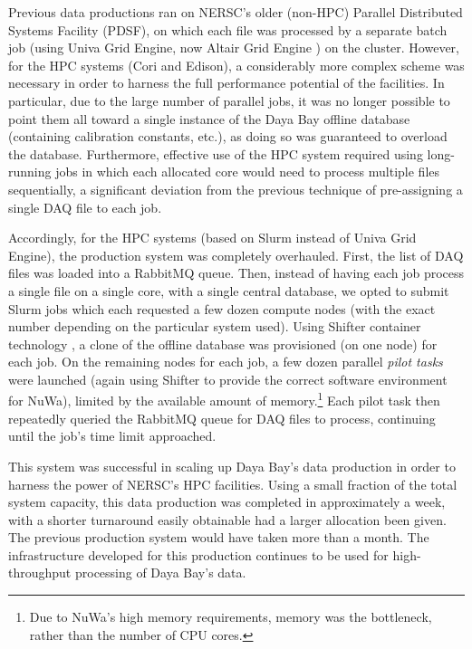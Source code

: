 \documentclass[../thesis.tex]{subfiles}
\begin{document}
Previous data productions ran on NERSC's older (non-HPC) Parallel Distributed Systems Facility (PDSF), on which each file was processed by a separate batch job (using Univa Grid Engine, now Altair Grid Engine \cite{AltairGridEngine}) on the cluster. However, for the HPC systems (Cori and Edison), a considerably more complex scheme was necessary in order to harness the full performance potential of the facilities. In particular, due to the large number of parallel jobs, it was no longer possible to point them all toward a single instance of the Daya Bay offline database (containing calibration constants, etc.), as doing so was guaranteed to overload the database. Furthermore, effective use of the HPC system required using long-running jobs in which each allocated core would need to process multiple files sequentially, a significant deviation from the previous technique of pre-assigning a single DAQ file to each job.

Accordingly, for the HPC systems (based on Slurm \cite{SLURM} instead of Univa Grid Engine), the production system was completely overhauled. First, the list of DAQ files was loaded into a RabbitMQ \cite{RabbitMQ} queue. Then, instead of having each job process a single file on a single core, with a single central database, we opted to submit Slurm jobs which each requested a few dozen compute nodes (with the exact number depending on the particular system used). Using Shifter container technology \cite{shifter}, a clone of the offline database was provisioned (on one node) for each job. On the remaining nodes for each job, a few dozen parallel \emph{pilot tasks} were launched (again using Shifter to provide the correct software environment for NuWa), limited by the available amount of memory.\footnote{Due to NuWa's high memory requirements, memory was the bottleneck, rather than the number of CPU cores.} Each pilot task then repeatedly queried the RabbitMQ queue for DAQ files to process, continuing until the job's time limit approached.

This system was successful in scaling up Daya Bay's data production in order to harness the power of NERSC's HPC facilities. Using a small fraction of the total system capacity, this data production was completed in approximately a week, with a shorter turnaround easily obtainable had a larger allocation been given. The previous production system would have taken more than a month. The infrastructure developed for this production continues to be used for high-throughput processing of Daya Bay's data.
\end{document}
